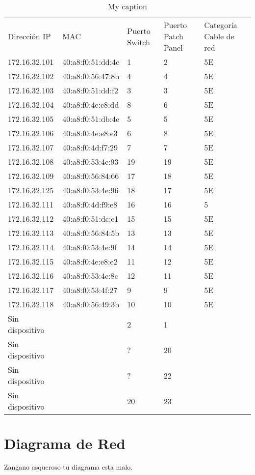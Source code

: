 \documentclass[spanish]{udpreport}
\begin{document}
\begin{table}[]
\centering
\caption{My caption}
\label{my-label}
\begin{tabular}{lllll}
Dirección IP  & MAC               & Puerto Switch & Puerto Patch Panel & Categoría Cable de red \\
172.16.32.101 & 40:a8:f0:51:dd:4c & 1             & 2                  & 5E                     \\
172.16.32.102 & 40:a8:f0:56:47:8b & 4             & 4                  & 5E                     \\
172.16.32.103 & 40:a8:f0:51:dd:f2 & 3             & 3                  & 5E                     \\
172.16.32.104 & 40:a8:f0:4e:e8:dd & 8             & 6                  & 5E                     \\
172.16.32.105 & 40:a8:f0:51:db:4e & 5             & 5                  & 5E                     \\
172.16.32.106 & 40:a8:f0:4e:e8:e3 & 6             & 8                  & 5E                     \\
172.16.32.107 & 40:a8:f0:4d:f7:29 & 7             & 7                  & 5E                     \\
172.16.32.108 & 40:a8:f0:53:4e:93 & 19            & 19                 & 5E                     \\
172.16.32.109 & 40:a8:f0:56:84:66 & 17            & 18                 & 5E                     \\
172.16.32.125 & 40:a8:f0:53:4e:96 & 18            & 17                 & 5E                     \\
172.16.32.111 & 40:a8:f0:4d:f9:e8 & 16            & 16                 & 5                      \\
172.16.32.112 & 40:a8:f0:51:dc:e1 & 15            & 15                 & 5E                     \\
172.16.32.113 & 40:a8:f0:56:84:5b & 13            & 13                 & 5E                     \\
172.16.32.114 & 40:a8:f0:53:4e:9f & 14            & 14                 & 5E                     \\
172.16.32.115 & 40:a8:f0:4e:e8:e2 & 11            & 12                 & 5E                     \\
172.16.32.116 & 40:a8:f0:53:4e:8c & 12            & 11                 & 5E                     \\
172.16.32.117 & 40:a8:f0:53:4f:27 & 9             & 9                  & 5E                     \\
172.16.32.118 & 40:a8:f0:56:49:3b & 10            & 10                 & 5E                     \\
Sin dispositivo	&	& 2	& 1 	&	\\
Sin dispositivo	&	& ?	& 20	&	\\
Sin dispositivo	&	& ?	& 22	&	\\
Sin dispositivo	&	& 20 & 23	&	\\
\end{tabular}
\end{table}

\chapter{Diagrama de Red}
Zangano asqueroso tu diagrama esta malo.

\listoffigures
\end{document}
